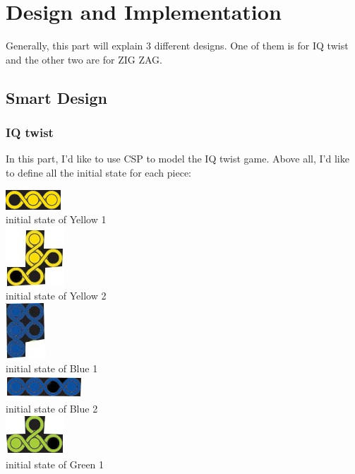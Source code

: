 \chapter{Design and Implementation}
\label{cha:design}
Generally, this part will explain 3 different designs. One of them is for IQ twist and the other two are for ZIG ZAG. 
\section{Smart Design}
\label{sec:des-hotpath}
\subsection{IQ twist}
In this part, I'd like to use CSP to model the IQ twist game. Above all, I'd like to define all the initial state for each piece:
\begin{center}
\includegraphics{figs/yellow1.jpg} 
\\initial state of Yellow 1
\\\includegraphics{figs/yellow2.jpg}
\\initial state of Yellow 2
\\\includegraphics{figs/blue1.jpg}
\\initial state of Blue 1
\\\includegraphics{figs/blue2.jpg}
\\initial state of Blue 2
\\\includegraphics{figs/green1.jpg}
\\initial state of Green 1 

\end{center}
